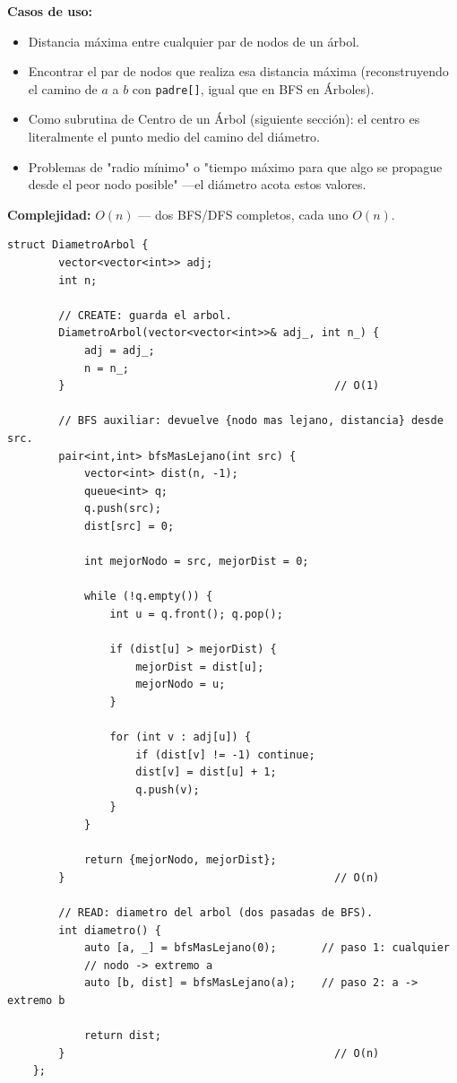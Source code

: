 \documentclass[10pt,a4paper,twocolumn]{article}
\begin{document}
\textbf{Casos de uso:}

\begin{itemize}
	\item Distancia máxima entre cualquier par de nodos de un árbol.
	\item Encontrar el par de nodos que realiza esa distancia máxima
	(reconstruyendo el camino de $a$ a $b$ con \texttt{padre[]},
	igual que en BFS en Árboles).
	\item Como subrutina de Centro de un Árbol (siguiente sección):
	el centro es literalmente el punto medio del camino del
	diámetro.
	\item Problemas de "radio mínimo" o "tiempo máximo para que algo
	se propague desde el peor nodo posible" —el diámetro acota estos
	valores.
\end{itemize}

\textbf{Complejidad:} $O(n)$ — dos BFS/DFS completos, cada uno
$O(n)$.

\begin{lstlisting}[style=cpp]
	struct DiametroArbol {
		vector<vector<int>> adj;
		int n;
		
		// CREATE: guarda el arbol.
		DiametroArbol(vector<vector<int>>& adj_, int n_) {
			adj = adj_;
			n = n_;
		}                                          // O(1)
		
		// BFS auxiliar: devuelve {nodo mas lejano, distancia} desde src.
		pair<int,int> bfsMasLejano(int src) {
			vector<int> dist(n, -1);
			queue<int> q;
			q.push(src);
			dist[src] = 0;
			
			int mejorNodo = src, mejorDist = 0;
			
			while (!q.empty()) {
				int u = q.front(); q.pop();
				
				if (dist[u] > mejorDist) {
					mejorDist = dist[u];
					mejorNodo = u;
				}
				
				for (int v : adj[u]) {
					if (dist[v] != -1) continue;
					dist[v] = dist[u] + 1;
					q.push(v);
				}
			}
			
			return {mejorNodo, mejorDist};
		}                                          // O(n)
		
		// READ: diametro del arbol (dos pasadas de BFS).
		int diametro() {
			auto [a, _] = bfsMasLejano(0);       // paso 1: cualquier
			// nodo -> extremo a
			auto [b, dist] = bfsMasLejano(a);    // paso 2: a -> extremo b
			
			return dist;
		}                                          // O(n)
	};
\end{lstlisting}
\end{document}
